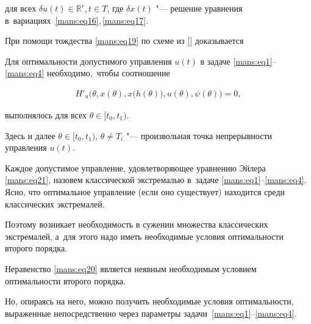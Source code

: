 для всех  $ \delta u(t)\in \mathbb R^{r} $,\,$ t\in T $, где $ \delta x(t) $  "--- решение уравнения в~вариациях~\mbox{\eqref{mans:eq16},\,\eqref{mans:eq17}.}



При помощи  тождества \eqref{mans:eq19} по схеме из [] доказывается



\smallskip



\begin{theorem}Для оптимальности допустимого управления $ u(t) $  в задаче \eqref{mans:eq1}--\eqref{mans:eq4} необходимо$,$ чтобы соотношение

\begin{gather}

\label{mans:eq21}

H'_{u}\bigl(\theta, x(\theta), x\bigl(h(\theta)\bigr), u(\theta), \psi (\theta)\bigr) =0 , 

\end{gather}

выполнялось для всех  $ \theta\in [ t_{0}, t_{1} )  .$

\end{theorem}



\smallskip







Здесь и далее  $ \theta\in [ t_{0}, t_{1} )  $,  $ \theta \neq T_{i} $ "--- произвольная точка непрерывности управления  $ u(t) $.



Каждое допустимое управление, удовлетворяющее уравнению Эйлера \eqref{mans:eq21}, назовем классической экстремалью в~задаче \eqref{mans:eq1}--\eqref{mans:eq4}. Ясно, что оптимальное управление (если оно существует) находится среди классических экстремалей.

Поэтому возникает необходимость в сужении множества классических экстремалей, а~для этого надо иметь необходимые условия оптимальности второго порядка. 



Неравенство \eqref{mans:eq20} является неявным необходимым условием оптимальности второго порядка. 

Но, опираясь на него, можно получить необходимые условия оптимальности, выраженные непосредственно через параметры задачи~\mbox{\eqref{mans:eq1}--\eqref{mans:eq4}.}



